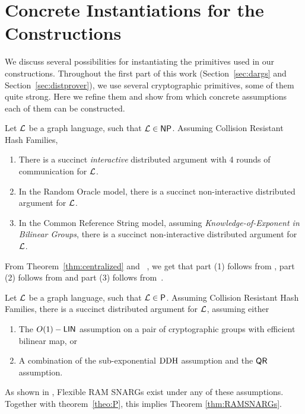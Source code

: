 \section{Concrete Instantiations for the Constructions }\label{app:concrete}
We discuss several possibilities for instantiating the primitives used in our constructions. Throughout the first part of this work (Section~\ref{sec:dargs} and Section~\ref{sec:distprover}), we use several cryptographic primitives, some of them quite strong. Here we refine them and show from which concrete assumptions each of them can be constructed. 

\begin{theorem}\label{thm:concDargs}
    Let $\mathcal{L}$ be a graph language, such that $\mathcal{L}\in {\mathsf{NP}}$. Assuming Collision Resistant Hash Families,
    \begin{enumerate}
        \item There is a succinct \emph{interactive} distributed argument with 4 rounds of communication for $\mathcal{L}$. 
        \item In the Random Oracle model, there is a succinct non-interactive distributed argument for $\mathcal{L}$.
        \item In the Common Reference String model, assuming \emph{Knowledge-of-Exponent in Bilinear Groups}, there is a succinct non-interactive distributed argument for $\mathcal{L}$. 
    \end{enumerate}
\end{theorem}
From Theorem~\ref{thm:centralized} and ~\cite{merkle1989certified}, we get that part (1) follows from \cite{kilian1992note}, part (2) follows from \cite{micali2000computationally} and part (3) follows from~\cite{bitansky2013SNARKsLIPs}.

\begin{theorem}\label{thm:RAMSNARGs}
    Let $\mathcal{L}$ be a graph language, such that $\mathcal{L}\in {\mathsf{P}}$. Assuming Collision Resistant Hash Families, there is a succinct distributed argument for $\mathcal{L}$, assuming either
    \begin{enumerate}
        \item The $O(1)-\mathsf{LIN}$ assumption on a pair of cryptographic groups with efficient bilinear map, or
        \item A combination of the sub-exponential $\mathrm{DDH}$ assumption and the $\mathsf{QR}$ assumption.
    \end{enumerate}
\end{theorem}
As shown in  \cite{cryptoeprint:2022/1320}, Flexible RAM SNARGs exist under any of these assumptions. Together with theorem~\ref{theo:P}, this implies Theorem \ref{thm:RAMSNARGs}.

